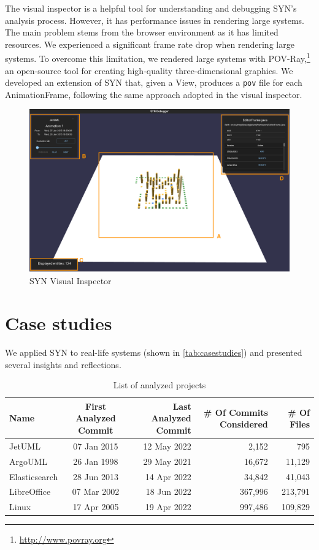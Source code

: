 \documentclass[11pt,twoside,english,singlespacing,headsepline,consistentlayout]{auxiliary/si-msc-thesis}
\begin{document}
The visual inspector is a helpful tool for understanding and debugging SYN's analysis process. However, it has performance issues in rendering large systems. The main problem stems from the browser environment as it has limited resources. We experienced a significant frame rate drop when rendering large systems. To overcome this limitation, we rendered large systems with POV-Ray,\footnote{\url{http://www.povray.org}} an open-source tool for creating high-quality three-dimensional graphics. We developed an extension of SYN that, given a View, produces a \texttt{pov} file for each AnimationFrame, following the same approach adopted in the visual inspector.  



\begin{figure}
    \center
    \includegraphics[width=\textwidth]{images/implementation/SYNUI-fileHistory.png}
    \caption{SYN Visual Inspector}
    \label{fig:SYNVisual}
\end{figure}

\section*{Case studies}
\graphicspath{ {images/casestudies} }

We applied SYN to real-life systems (shown in \autoref{tab:casestudies}) and presented several insights and reflections. 

\begin{table}[ht]
    \centering
    \small
    \begin{tabular}{lcrrr} 
        \hline
        {\bf Name} & {\bf First Analyzed Commit} & {\bf Last Analyzed Commit} & {\bf \# Of Commits Considered} & {\bf \# Of Files}\\ 
        \hline
        JetUML & 07 Jan 2015 & 12 May 2022 & 2,152 & 795\\ 
        ArgoUML & 26 Jan 1998 & 29 May 2021 & 16,672 & 11,129 \\
        Elasticsearch & 28 Jun 2013 & 14 Apr 2022 & 34,842 & 41,043 \\
        LibreOffice & 07 Mar 2002 & 18 Jun 2022 & 367,996 & 213,791 \\
        Linux & 17 Apr 2005 & 19 Apr 2022 & 997,486 & 109,829
    \end{tabular}
    \caption{List of analyzed projects}
    \label{tab:casestudies}
\end{table}
\end{document}
